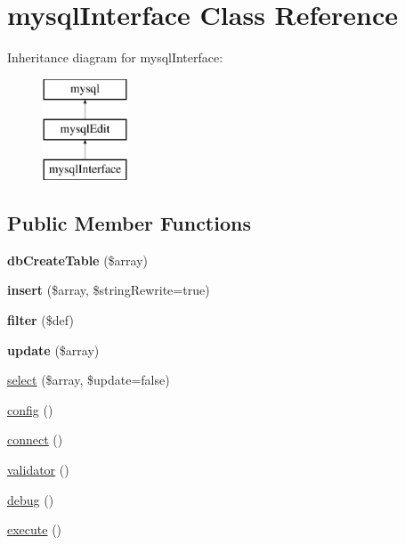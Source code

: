 \hypertarget{classmysql_interface}{\section{mysql\-Interface Class Reference}
\label{classmysql_interface}
}
Inheritance diagram for mysql\-Interface\-:\begin{figure}[H]
\begin{center}
\leavevmode
\includegraphics[height=3.000000cm]{classmysql_interface}
\end{center}
\end{figure}
\subsection*{Public Member Functions}
\begin{DoxyCompactItemize}
\item 
\hypertarget{classmysql_interface_ab8f860d15b6c8e90459cd3ee3a9a746b}{{\bfseries db\-Create\-Table} (\$array)}\label{classmysql_interface_ab8f860d15b6c8e90459cd3ee3a9a746b}

\item 
\hypertarget{classmysql_interface_a083e6cc172b111ec9c7eac0c9fae8a7a}{{\bfseries insert} (\$array, \$string\-Rewrite=true)}\label{classmysql_interface_a083e6cc172b111ec9c7eac0c9fae8a7a}

\item 
\hypertarget{classmysql_interface_a99e7e1b61e6e94996a4f9ddb84550a9c}{{\bfseries filter} (\$def)}\label{classmysql_interface_a99e7e1b61e6e94996a4f9ddb84550a9c}

\item 
\hypertarget{classmysql_interface_a3211e273c3ee674b966bab63d966c4b2}{{\bfseries update} (\$array)}\label{classmysql_interface_a3211e273c3ee674b966bab63d966c4b2}

\item 
\hyperlink{classmysql_interface_a1a124f363344d55e5d89910dca1b0ac5}{select} (\$array, \$update=false)
\item 
\hyperlink{classmysql_interface_a8a549a19ec81f3aafb2b231aaa12e138}{config} ()
\item 
\hyperlink{classmysql_interface_a78572828d11dcdf2a498497d9001d557}{connect} ()
\item 
\hyperlink{classmysql_interface_aba1c0c23ab9113d682823ea32a51332e}{validator} ()
\item 
\hyperlink{classmysql_interface_aaed74f7942d3fc56582e99324500e87b}{debug} ()
\item 
\hyperlink{classmysql_interface_a1909f4b7f8129c7790cb75de2ffbe1e4}{execute} ()
\end{DoxyCompactItemize}
